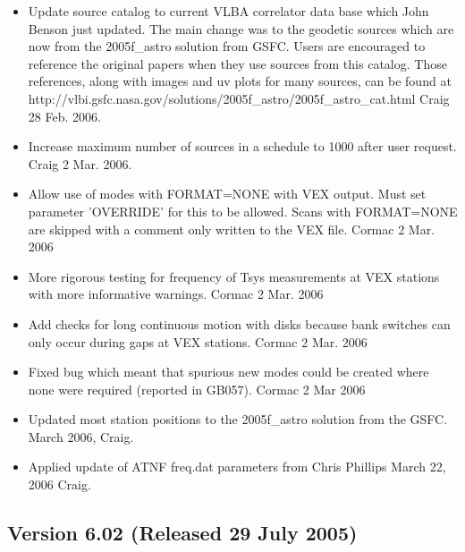 \documentclass{report}
\begin{document}
\begin{itemize}
\item Update source catalog to current VLBA correlator data base which
John Benson just updated.  The main change was to the geodetic sources
which are now from the 2005f\_astro solution from GSFC.  Users
are encouraged to reference the original papers when they use sources
from this catalog.  Those references, along with images and uv plots
for many sources, can be found at 
{http://vlbi.gsfc.nasa.gov/solutions/2005f\_astro/2005f\_astro\_cat.html}
Craig  28 Feb. 2006.

\item Increase maximum number of sources in a schedule to 1000 after
user request.  Craig  2 Mar. 2006.

\item Allow use of modes with FORMAT=NONE with VEX output. Must set parameter
'OVERRIDE' for this to be allowed. Scans with FORMAT=NONE are skipped with a
comment only written to the VEX file.  Cormac 2 Mar. 2006

\item More rigorous testing for frequency of Tsys measurements at VEX
stations with more informative warnings.  Cormac 2 Mar. 2006

\item Add checks for long continuous motion with disks because bank
switches can only occur during gaps at VEX stations.  Cormac  2 Mar. 2006

\item Fixed bug which meant that spurious new modes could be created
where none were required (reported in GB057).  Cormac  2 Mar 2006

\item Updated most station positions to the 2005f\_astro
solution from the GSFC.  March 2006, Craig.

\item Applied update of ATNF freq.dat parameters from Chris Phillips
March 22, 2006 Craig.


\end{itemize}

\subsection{\label{SSEC:VER_6.02}Version 6.02 (Released 29 July 2005)}
\end{document}
